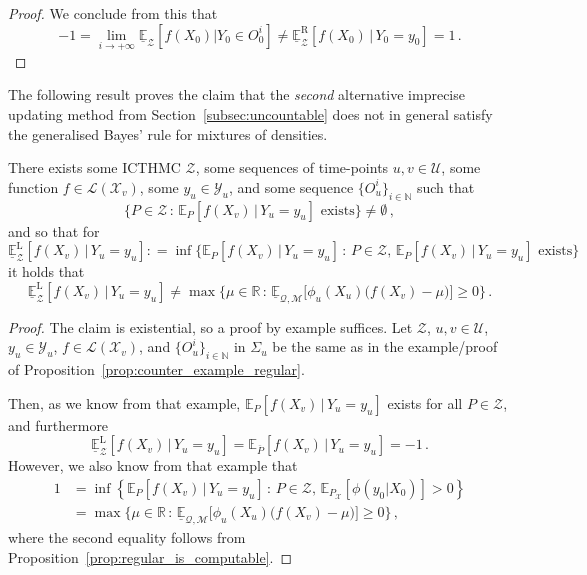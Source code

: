 \documentclass[twoside,11pt]{article}
\newcommand{\nats}{\mathbb{N}}
\newcommand{\reals}{\mathbb{R}}
\newcommand{\states}{\mathcal{X}}
\newcommand{\observs}{\mathcal{Y}}
\newcommand{\lexp}{\underline{\mathbb{E}}_{\rateset,\mathcal{M}}}
\newcommand{\gambles}{\mathcal{L}}
\newcommand{\rateset}{\mathcal{Q}}
\newcommand{\coloneqq}{:\!=}
\begin{document}
\begin{proof}
We conclude from this that
\begin{equation*}
-1 =  \lim_{i\to+\infty} \underline{\mathbb{E}}_\mathcal{Z}[f(X_0)\vert Y_0\in O_0^i] \neq \underline{\mathbb{E}}_\mathcal{Z}^\mathrm{R}[f(X_0)\,\vert\, Y_0=y_0] = 1\,.
\end{equation*}
\end{proof}

The following result proves the claim that the \emph{second} alternative imprecise updating method from Section~\ref{subsec:uncountable} does not in general satisfy the generalised Bayes' rule for mixtures of densities.
\begin{corollary}
There exists some ICTHMC $\mathcal{Z}$, some sequences of time-points $u,v\in\mathcal{U}$, some function $f\in\gambles(\states_v)$, some $y_u\in\observs_u$, and some sequence $\{O_u^i\}_{i\in\nats}$ such that
\begin{equation*}
\{P\in\mathcal{Z}\,:\,\text{$\mathbb{E}_P[f(X_v)\,\vert\,Y_u=y_u]$ exists}\}\neq\emptyset\,,
\end{equation*}
and so that for
\begin{equation*}
\underline{\mathbb{E}}_\mathcal{Z}^\mathrm{L}[f(X_v)\,\vert\, Y_u=y_u]\coloneqq \inf\bigl\{\mathbb{E}_P[f(X_v)\,\vert\,Y_u=y_u]\,:\,P\in\mathcal{Z},\,\text{$\mathbb{E}_P[f(X_v)\,\vert\,Y_u=y_u]$ exists}\bigr\}
\end{equation*}
it holds that
\begin{equation*}
\underline{\mathbb{E}}_\mathcal{Z}^\mathrm{L}[f(X_v)\,\vert\, Y_u=y_u] \neq \max\{\mu\in\reals\,:\,\lexp\bigl[\phi_u(X_u)\bigl(f(X_v)-\mu\bigr)\bigr]\geq 0\}\,.
\end{equation*}
\end{corollary}
\begin{proof}
The claim is existential, so a proof by example suffices. Let $\mathcal{Z}$, $u,v\in\mathcal{U}$, $y_u\in\observs_u$, $f\in\gambles(\states_v)$, and $\{O_u^i\}_{i\in\nats}$ in $\Sigma_u$ be the same as in the example/proof of Proposition~\ref{prop:counter_example_regular}.

Then, as we know from that example, $\mathbb{E}_P[f(X_v)\,\vert\,Y_u=y_u]$ exists for all $P\in\mathcal{Z}$, and furthermore
\begin{equation*}
\underline{\mathbb{E}}_\mathcal{Z}^\mathrm{L}[f(X_v)\,\vert\, Y_u=y_u] = \mathbb{E}_{\overline{P}}[f(X_v)\,\vert\,Y_u=y_u] = -1\,.
\end{equation*}
However, we also know from that example that
\begin{align*}
1 &= \inf\left\{\mathbb{E}_P[f(X_v)\,\vert\,Y_u=y_u]\,:\,P\in\mathcal{Z},\,\mathbb{E}_{P_\states}[\phi(y_0\vert X_0)]>0\right\} \\
 &= \max\{\mu\in\reals\,:\,\lexp\bigl[\phi_u(X_u)\bigl(f(X_v)-\mu\bigr)\bigr]\geq 0\}\,,
\end{align*}
where the second equality follows from Proposition~\ref{prop:regular_is_computable}.
\end{proof}
\end{document}
